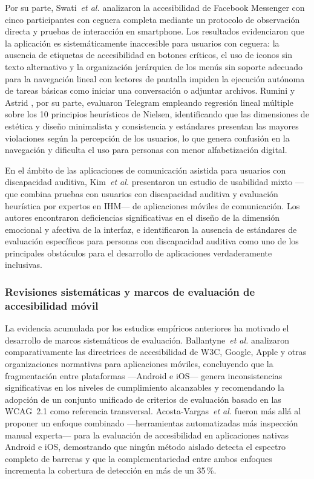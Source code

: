 \documentclass[journal]{IEEEtran}
\begin{document}
				Por su parte, Swati~\textit{et al.} \cite{swati2021} analizaron la accesibilidad de Facebook Messenger con cinco participantes con ceguera completa mediante un protocolo de observaci\'on directa y pruebas de interacci\'on en smartphone. Los resultados evidenciaron que la aplicaci\'on es sistem\'aticamente inaccesible para usuarios con ceguera: la ausencia de etiquetas de accesibilidad en botones cr\'iticos, el uso de iconos sin texto alternativo y la organizaci\'on jer\'arquica de los men\'us sin soporte adecuado para la navegaci\'on lineal con lectores de pantalla impiden la ejecuci\'on aut\'onoma de tareas b\'asicas como iniciar una conversaci\'on o adjuntar archivos. Rumini y Astrid \cite{rumini2019}, por su parte, evaluaron Telegram empleando regresi\'on lineal m\'ultiple sobre los 10 principios heur\'isticos de Nielsen, identificando que las dimensiones de est\'etica y dise\~no minimalista y consistencia y est\'andares presentan las mayores violaciones seg\'un la percepci\'on de los usuarios, lo que genera confusi\'on en la navegaci\'on y dificulta el uso para personas con menor alfabetizaci\'on digital.
				
				En el \'ambito de las aplicaciones de comunicaci\'on asistida para usuarios con discapacidad auditiva, Kim~\textit{et al.} \cite{kim2024} presentaron un estudio de usabilidad mixto ---que combina pruebas con usuarios con discapacidad auditiva y evaluaci\'on heur\'istica por expertos en IHM--- de aplicaciones m\'oviles de comunicaci\'on. Los autores encontraron deficiencias significativas en el dise\~no de la dimensi\'on emocional y afectiva de la interfaz, e identificaron la ausencia de est\'andares de evaluaci\'on espec\'ificos para personas con discapacidad auditiva como uno de los principales obst\'aculos para el desarrollo de aplicaciones verdaderamente inclusivas.
			
			\subsubsection{Revisiones sistem\'aticas y marcos de evaluaci\'on de accesibilidad m\'ovil}
				La evidencia acumulada por los estudios emp\'iricos anteriores ha motivado el desarrollo de marcos sistem\'aticos de evaluaci\'on. Ballantyne~\textit{et al.} \cite{ballantyne2018} analizaron comparativamente las directrices de accesibilidad de W3C, Google, Apple y otras organizaciones normativas para aplicaciones m\'oviles, concluyendo que la fragmentaci\'on entre plataformas ---Android e iOS--- genera inconsistencias significativas en los niveles de cumplimiento alcanzables y recomendando la adopci\'on de un conjunto unificado de criterios de evaluaci\'on basado en las WCAG~2.1 como referencia transversal. Acosta-Vargas~\textit{et al.} \cite{acosta2021} fueron m\'as all\'a al proponer un enfoque combinado ---herramientas automatizadas m\'as inspecci\'on manual experta--- para la evaluaci\'on de accesibilidad en aplicaciones nativas Android e iOS, demostrando que ning\'un m\'etodo aislado detecta el espectro completo de barreras y que la complementariedad entre ambos enfoques incrementa la cobertura de detecci\'on en m\'as de un 35\,\%.
				
\end{document}
